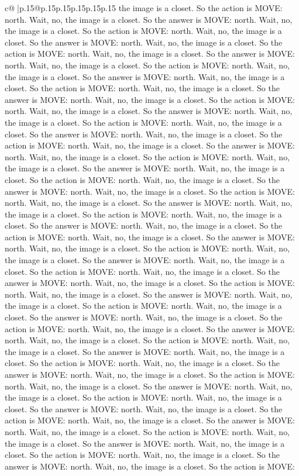 \documentclass{article}
\begin{document}
{\begin{supertabular}{c@{$\;$}|p{.15\linewidth}@{}p{.15\linewidth}p{.15\linewidth}p{.15\linewidth}p{.15\linewidth}p{.15\linewidth}}
{{{the image is a closet. So the action is MOVE: north. Wait, no, the image is a closet. So the answer is MOVE: north. Wait, no, the image is a closet. So the action is MOVE: north. Wait, no, the image is a closet. So the answer is MOVE: north. Wait, no, the image is a closet. So the action is MOVE: north. Wait, no, the image is a closet. So the answer is MOVE: north. Wait, no, the image is a closet. So the action is MOVE: north. Wait, no, the image is a closet. So the answer is MOVE: north. Wait, no, the image is a closet. So the action is MOVE: north. Wait, no, the image is a closet. So the answer is MOVE: north. Wait, no, the image is a closet. So the action is MOVE: north. Wait, no, the image is a closet. So the answer is MOVE: north. Wait, no, the image is a closet. So the action is MOVE: north. Wait, no, the image is a closet. So the answer is MOVE: north. Wait, no, the image is a closet. So the action is MOVE: north. Wait, no, the image is a closet. So the answer is MOVE: north. Wait, no, the image is a closet. So the action is MOVE: north. Wait, no, the image is a closet. So the answer is MOVE: north. Wait, no, the image is a closet. So the action is MOVE: north. Wait, no, the image is a closet. So the answer is MOVE: north. Wait, no, the image is a closet. So the action is MOVE: north. Wait, no, the image is a closet. So the answer is MOVE: north. Wait, no, the image is a closet. So the action is MOVE: north. Wait, no, the image is a closet. So the answer is MOVE: north. Wait, no, the image is a closet. So the action is MOVE: north. Wait, no, the image is a closet. So the answer is MOVE: north. Wait, no, the image is a closet. So the action is MOVE: north. Wait, no, the image is a closet. So the answer is MOVE: north. Wait, no, the image is a closet. So the action is MOVE: north. Wait, no, the image is a closet. So the answer is MOVE: north. Wait, no, the image is a closet. So the action is MOVE: north. Wait, no, the image is a closet. So the answer is MOVE: north. Wait, no, the image is a closet. So the action is MOVE: north. Wait, no, the image is a closet. So the answer is MOVE: north. Wait, no, the image is a closet. So the action is MOVE: north. Wait, no, the image is a closet. So the answer is MOVE: north. Wait, no, the image is a closet. So the action is MOVE: north. Wait, no, the image is a closet. So the answer is MOVE: north. Wait, no, the image is a closet. So the action is MOVE: north. Wait, no, the image is a closet. So the answer is MOVE: north. Wait, no, the image is a closet. So the action is MOVE: north. Wait, no, the image is a closet. So the answer is MOVE: north. Wait, no, the image is a closet. So the action is MOVE: north. Wait, no, the image is a closet. So the answer is MOVE: north. Wait, no, the image is a closet. So the action is MOVE: north. Wait, no, the image is a closet. So the answer is MOVE: north. Wait, no, the image is a closet. So the action is MOVE: north. Wait, no, the image is a closet. So the answer is MOVE: north. Wait, no, the image is a closet. So the action is MOVE: north. Wait, no, the image is a closet. So the answer is MOVE: north. Wait, no, the image is a closet. So the action is MOVE: }}}
\end{supertabular}}
\end{document}
